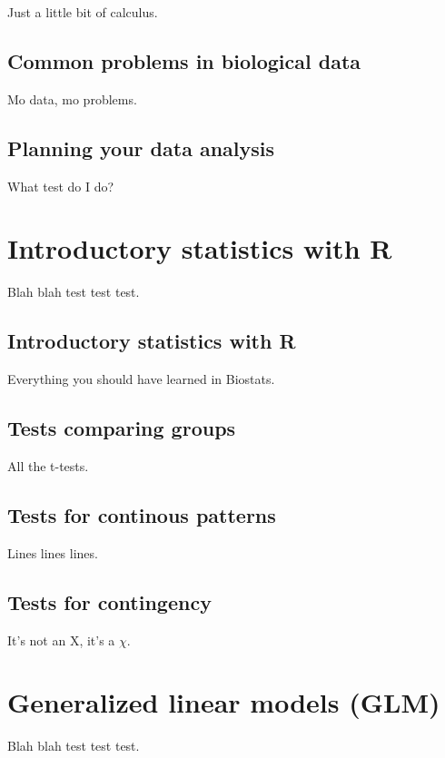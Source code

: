 \documentclass[
  13,
  letterpaper,
]{report}
\begin{document}
Just a little bit of calculus.

\chapter{Common problems in biological data}\label{sec-10}

Mo data, mo problems.

\chapter{Planning your data analysis}\label{sec-11}

What test do I do?

\part{Introductory statistics with R}

Blah blah test test test.

\chapter{Introductory statistics with R}\label{sec-12}

Everything you should have learned in Biostats.

\chapter{Tests comparing groups}\label{sec-13}

All the t-tests.

\chapter{Tests for continous patterns}\label{sec-14}

Lines lines lines.

\chapter{Tests for contingency}\label{sec-15}

It's not an X, it's a \(\chi\).

\part{Generalized linear models (GLM)}

Blah blah test test test.
\end{document}
